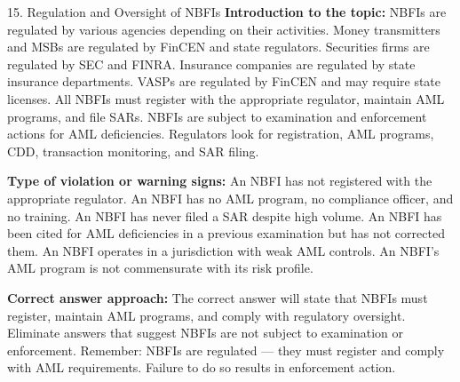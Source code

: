 \documentclass[11pt,a4paper]{beamer}
\begin{document}
\begin{frame}{15. Regulation and Oversight of NBFIs}
\tiny
\noindent\textbf{Introduction to the topic:} NBFIs are regulated by various agencies depending on their activities. Money transmitters and MSBs are regulated by FinCEN and state regulators. Securities firms are regulated by SEC and FINRA. Insurance companies are regulated by state insurance departments. VASPs are regulated by FinCEN and may require state licenses. All NBFIs must register with the appropriate regulator, maintain AML programs, and file SARs. NBFIs are subject to examination and enforcement actions for AML deficiencies. Regulators look for registration, AML programs, CDD, transaction monitoring, and SAR filing.

\vspace{0.1cm}
\noindent\textbf{Type of violation or warning signs:} An NBFI has not registered with the appropriate regulator. An NBFI has no AML program, no compliance officer, and no training. An NBFI has never filed a SAR despite high volume. An NBFI has been cited for AML deficiencies in a previous examination but has not corrected them. An NBFI operates in a jurisdiction with weak AML controls. An NBFI's AML program is not commensurate with its risk profile.

\vspace{0.1cm}
\noindent\textbf{Correct answer approach:} The correct answer will state that NBFIs must register, maintain AML programs, and comply with regulatory oversight. Eliminate answers that suggest NBFIs are not subject to examination or enforcement. Remember: NBFIs are regulated — they must register and comply with AML requirements. Failure to do so results in enforcement action.
\end{frame}
\end{document}
